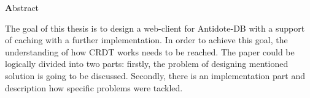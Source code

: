 
\begin{center}
{\Large \textbf Abstract}
\end{center}
\vspace{1cm}


The goal of this thesis is to design a web-client for Antidote-DB with a support of caching with a further implementation. In order to achieve this goal, the understanding of how CRDT works needs to be reached. The paper could be logically divided into two parts: firstly, the problem of designing mentioned solution is going to be discussed. Secondly, there is an implementation part and description how specific problems were tackled.